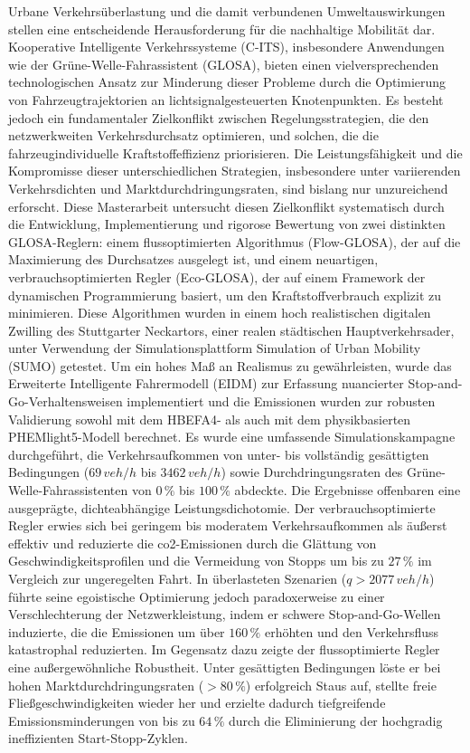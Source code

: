Urbane Verkehrsüberlastung und die damit verbundenen Umweltauswirkungen stellen eine entscheidende Herausforderung für die nachhaltige Mobilität dar. Kooperative Intelligente Verkehrssysteme (C-ITS), insbesondere Anwendungen wie der Grüne-Welle-Fahrassistent (GLOSA), bieten einen vielversprechenden technologischen Ansatz zur Minderung dieser Probleme durch die Optimierung von Fahrzeugtrajektorien an lichtsignalgesteuerten Knotenpunkten. Es besteht jedoch ein fundamentaler Zielkonflikt zwischen Regelungsstrategien, die den netzwerkweiten Verkehrsdurchsatz optimieren, und solchen, die die fahrzeugindividuelle Kraftstoffeffizienz priorisieren. Die Leistungsfähigkeit und die Kompromisse dieser unterschiedlichen Strategien, insbesondere unter variierenden Verkehrsdichten und Marktdurchdringungsraten, sind bislang nur unzureichend erforscht.
\mynewline
Diese Masterarbeit untersucht diesen Zielkonflikt systematisch durch die Entwicklung, Implementierung und rigorose Bewertung von zwei distinkten GLOSA-Reglern: einem flussoptimierten Algorithmus (Flow-GLOSA), der auf die Maximierung des Durchsatzes ausgelegt ist, und einem neuartigen, verbrauchsoptimierten Regler (Eco-GLOSA), der auf einem Framework der dynamischen Programmierung basiert, um den Kraftstoffverbrauch explizit zu minimieren. Diese Algorithmen wurden in einem hoch realistischen digitalen Zwilling des Stuttgarter Neckartors, einer realen städtischen Hauptverkehrsader, unter Verwendung der Simulationsplattform Simulation of Urban Mobility (SUMO) getestet. Um ein hohes Maß an Realismus zu gewährleisten, wurde das Erweiterte Intelligente Fahrermodell (EIDM) zur Erfassung nuancierter Stop-and-Go-Verhaltensweisen implementiert und die Emissionen wurden zur robusten Validierung sowohl mit dem HBEFA4- als auch mit dem physikbasierten PHEMlight5-Modell berechnet. Es wurde eine umfassende Simulationskampagne durchgeführt, die Verkehrsaufkommen von unter- bis vollständig gesättigten Bedingungen ($69\,\unit{veh/h}$ bis $3462\,\unit{veh/h}$) sowie Durchdringungsraten des Grüne-Welle-Fahrassistenten von $0\,\%$ bis $100\,\%$ abdeckte.
\mynewline
Die Ergebnisse offenbaren eine ausgeprägte, dichteabhängige Leistungsdichotomie. Der verbrauchsoptimierte Regler erwies sich bei geringem bis moderatem Verkehrsaufkommen als äußerst effektiv und reduzierte die \ac{co2}-Emissionen durch die Glättung von Geschwindigkeitsprofilen und die Vermeidung von Stopps um bis zu $27\,\%$ im Vergleich zur ungeregelten Fahrt. In überlasteten Szenarien ($q > 2077\,\unit{veh/h}$) führte seine egoistische Optimierung jedoch paradoxerweise zu einer Verschlechterung der Netzwerkleistung, indem er schwere Stop-and-Go-Wellen induzierte, die die Emissionen um über $160\,\%$ erhöhten und den Verkehrsfluss katastrophal reduzierten. Im Gegensatz dazu zeigte der flussoptimierte Regler eine außergewöhnliche Robustheit. Unter gesättigten Bedingungen löste er bei hohen Marktdurchdringungsraten ($>80\,\%$) erfolgreich Staus auf, stellte freie Fließgeschwindigkeiten wieder her und erzielte dadurch tiefgreifende Emissionsminderungen von bis zu $64\,\%$ durch die Eliminierung der hochgradig ineffizienten Start-Stopp-Zyklen.
